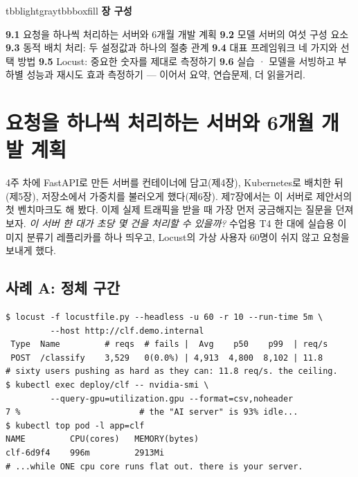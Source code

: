\vspace{3.5pt}

\begin{calloutbox}{tbblightgray}{tbbboxfill}
{\normalsize\bfseries\color{tbbink}장 구성}\par\vspace{3pt}
\textbf{9.1} 요청을 하나씩 처리하는 서버와 6개월 개발 계획    \textbf{9.2} 모델 서버의 여섯 구성 요소    \textbf{9.3} 동적 배치 처리: 두 설정값과 하나의 절충 관계    \textbf{9.4} 대표 프레임워크 네 가지와 선택 방법    \textbf{9.5} Locust: 중요한 숫자를 제대로 측정하기    \textbf{9.6} 실습 · 모델을 서빙하고 부하별 성능과 재시도 효과 측정하기 — 이어서 요약, 연습문제, 더 읽을거리.
\end{calloutbox}

\section{요청을 하나씩 처리하는 서버와 6개월 개발 계획}

4주 차에 FastAPI로 만든 서버를 컨테이너에 담고(제4장), Kubernetes로 배치한 뒤(제5장), 저장소에서 가중치를 불러오게 했다(제6장). 제7장에서는 이 서버로 제안서의 첫 벤치마크도 해 봤다. 이제 실제 트래픽을 받을 때 가장 먼저 궁금해지는 질문을 던져 보자. \textit{이 서버 한 대가 초당 몇 건을 처리할 수 있을까?} 수업용 T4 한 대에 실습용 이미지 분류기 레플리카를 하나 띄우고, Locust의 가상 사용자 60명이 쉬지 않고 요청을 보내게 했다.

\subsection*{사례 A: 정체 구간}

\begin{terminalbox}
\begin{Verbatim}[breaklines=true,breakanywhere=true,fontsize=\small,formatcom=\color{tbbtermfg},codes=\tbbcodeactive]
$ locust -f locustfile.py --headless -u 60 -r 10 --run-time 5m \
         --host http://clf.demo.internal
 Type  Name         # reqs  # fails |  Avg    p50    p99  | req/s
 POST  /classify    3,529   0(0.0%) | 4,913  4,800  8,102 | 11.8
# sixty users pushing as hard as they can: 11.8 req/s. the ceiling.
$ kubectl exec deploy/clf -- nvidia-smi \
         --query-gpu=utilization.gpu --format=csv,noheader
7 %                        # the "AI server" is 93% idle...
$ kubectl top pod -l app=clf
NAME         CPU(cores)   MEMORY(bytes)
clf-6d9f4    996m         2913Mi
# ...while ONE cpu core runs flat out. there is your server.
\end{Verbatim}
\end{terminalbox}

